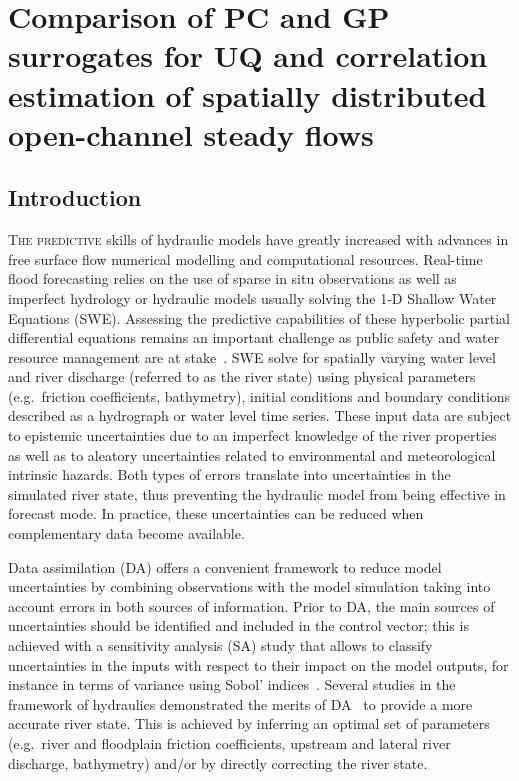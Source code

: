 \chapter{Comparison of PC and GP surrogates for UQ and correlation estimation of spatially distributed open-channel steady flows}\label{chap:mascaret}

\section{Introduction}

\lettrine{T}{he predictive} skills of hydraulic models have greatly increased with advances in free surface flow numerical modelling and computational resources. Real-time flood forecasting relies on the use of sparse in situ observations as well as imperfect hydrology or hydraulic models usually solving the 1-D Shallow Water Equations (SWE). Assessing the predictive capabilities of these hyperbolic partial differential equations remains an important challenge as public safety and water resource management are at stake~\citep{weerts2011}. SWE solve for spatially varying water level and river discharge (referred to as the river state) using physical parameters (e.g.~friction coefficients, bathymetry), initial conditions and boundary conditions described as a hydrograph or water level time series. These input data are subject to epistemic uncertainties due to an imperfect knowledge of the river properties as well as to aleatory uncertainties related to environmental and meteorological intrinsic hazards. Both types of errors translate into uncertainties in the simulated river state, thus preventing the hydraulic model from being effective in forecast mode. In practice, these uncertainties can be reduced when complementary data become available.

Data assimilation (DA) offers a convenient framework to reduce model uncertainties by combining observations with the model simulation taking into account errors in both sources of information. Prior to DA, the main sources of uncertainties should be identified and included in the control vector; this is achieved with a sensitivity analysis (SA) study that allows to classify uncertainties in the inputs with respect to their impact on the model outputs, for instance in terms of variance using Sobol' indices~\citep{iooss2016,DeLozzo2017}. Several studies in the framework of hydraulics demonstrated the merits of DA~\citep{barthelemy2015,cloke2009,dechant2011,habert2016,moradkhani2005} to provide a more accurate river state.
This is achieved by inferring an optimal set of parameters (e.g.~river and floodplain friction coefficients, upstream and lateral river discharge, bathymetry) and/or by directly correcting the river state.

